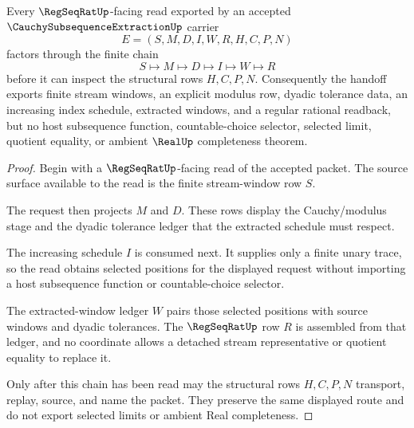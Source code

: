 \begin{theorem}
\label{thm:cauchy-subsequence-extraction-regseqrat-handoff}
Every $\RegSeqRatUp$-facing read exported by an accepted $\CauchySubsequenceExtractionUp$ carrier
$$
E=(S,M,D,I,W,R,H,C,P,N)
$$
factors through the finite chain
$$
S \longmapsto M \longmapsto D \longmapsto I \longmapsto W \longmapsto R
$$
before it can inspect the structural rows $H,C,P,N$. Consequently the handoff exports finite stream windows, an explicit modulus row, dyadic tolerance data, an increasing index schedule, extracted windows, and a regular rational readback, but no host subsequence function, countable-choice selector, selected limit, quotient equality, or ambient $\RealUp$ completeness theorem.
\end{theorem}
\begin{proof}
Begin with a $\RegSeqRatUp$-facing read of the accepted packet. The source surface available to the read is the finite stream-window row $S$.

The request then projects $M$ and $D$. These rows display the Cauchy/modulus stage and the dyadic tolerance ledger that the extracted schedule must respect.

The increasing schedule $I$ is consumed next. It supplies only a finite unary trace, so the read obtains selected positions for the displayed request without importing a host subsequence function or countable-choice selector.

The extracted-window ledger $W$ pairs those selected positions with source windows and dyadic tolerances. The $\RegSeqRatUp$ row $R$ is assembled from that ledger, and no coordinate allows a detached stream representative or quotient equality to replace it.

Only after this chain has been read may the structural rows $H,C,P,N$ transport, replay, source, and name the packet. They preserve the same displayed route and do not export selected limits or ambient Real completeness.
\end{proof}


